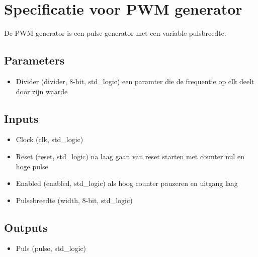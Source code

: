 \documentclass{article}
\begin{document}
\section{Specificatie voor PWM generator}
De PWM generator is een pulse generator met een variable pulsbreedte.
\subsection{Parameters}
\begin{itemize}
\item Divider (divider, 8-bit, std\_logic) een paramter die de frequentie op clk deelt door zijn waarde

\end{itemize}
\subsection{Inputs}
\begin{itemize}
\item Clock (clk, std\_logic)
\item Reset (reset, std\_logic) na laag gaan van reset starten met counter nul en hoge pulse
\item Enabled (enabled, std\_logic) als hoog counter pauzeren en uitgang laag
\item Pulsebreedte (width, 8-bit, std\_logic)
\end{itemize}
\subsection{Outputs}
\begin{itemize}
\item Puls (pulse, std\_logic)
\end{itemize}
\end{document}
